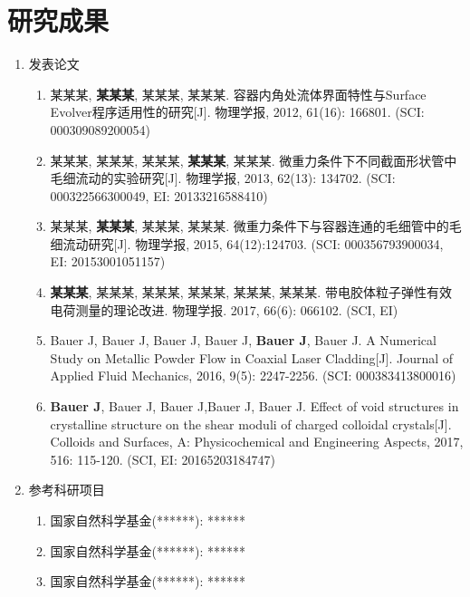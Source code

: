 \chapter{研究成果}
\begin{enumerate}
	\item 发表论文
		\begin{enumerate}
			\item 某某某, \textbf{某某某}, 某某某, 某某某.
			容器内角处流体界面特性与Surface Evolver程序适用性的研究\CJKsetecglue{}[J].  %
			物理学报, 2012, 61(16): 166801.
			(SCI: 000309089200054)
			
			\item 某某某, 某某某, 某某某, \textbf{某某某}, 某某某.
			微重力条件下不同截面形状管中毛细流动的实验研究\CJKsetecglue{}[J].
			物理学报, 2013, 62(13): 134702.
			(SCI: 000322566300049, EI: 20133216588410)
			
			\item 某某某, \textbf{某某某}, 某某某, 某某某.
			微重力条件下与容器连通的毛细管中的毛细流动研究\CJKsetecglue{}[J].
			物理学报, 2015, 64(12):124703.
			(SCI: 000356793900034, EI: 20153001051157)			
						
			\item \textbf{某某某}, 某某某, 某某某, 某某某, 某某某, 某某某.
			带电胶体粒子弹性有效电荷测量的理论改进\CJKsetecglue[J].
			物理学报. 2017, 66(6): 066102. (SCI, EI)
			
			\item Bauer J, Bauer J, Bauer J, Bauer J, \textbf{Bauer J}, Bauer J.
			A Numerical Study on Metallic Powder Flow in Coaxial Laser Cladding[J].
			Journal of Applied Fluid Mechanics, 2016, 9(5): 2247-2256.
			(SCI: 000383413800016)
			
			\item \textbf{Bauer J}, Bauer J, Bauer J,Bauer J, Bauer J.
			Effect of void structures in crystalline structure on the shear moduli of charged colloidal crystals[J].
			Colloids and Surfaces, A: Physicochemical and Engineering Aspects, 2017, 516: 115-120.
			(SCI, EI: 20165203184747)

			
		\end{enumerate}
	\item 参考科研项目
		\begin{enumerate}
			\item 国家自然科学基金(******): ******
			\item 国家自然科学基金(******): ******
			\item 国家自然科学基金(******): ******
		\end{enumerate}
\end{enumerate}

